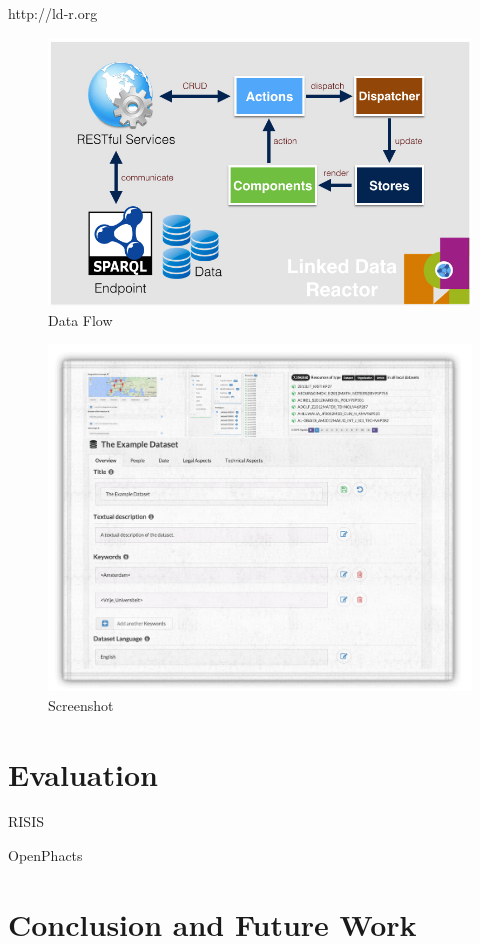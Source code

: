 \documentclass{acm_proc_article-sp}
\begin{document}
http://ld-r.org


\begin{figure}
  \includegraphics[width=.9\linewidth]{images/dataflow.jpg}
  \caption{Data Flow}
\end{figure}

\begin{figure}
  \includegraphics[width=.9\linewidth]{images/screenshot.png}
  \caption{Screenshot}
\end{figure}

\section{Evaluation}

RISIS

OpenPhacts

\section{Conclusion and Future Work}
\end{document}
